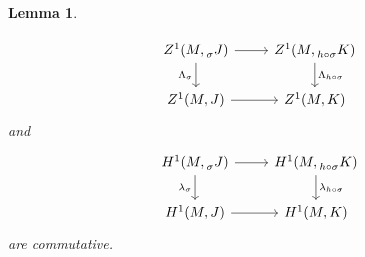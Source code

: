 \documentclass[a4paper,english,12pt]{amsart}
\newcommand{\sJ}{\prescript{}{\sigma}J}
\newtheorem{lem}[equation]{Lemma}
\numberwithin{equation}{subsection}
\begin{document}
\begin{lem}
\begin{enumerate}
\[\begin{tikzcd}
	{Z^1(M, \sJ)} & {Z^1(M,\prescript{}{h\circ\sigma}K)} \\
	{Z^1(M,J)} & {Z^1(M,K)}
	\arrow[from=1-1, to=1-2]
	\arrow["{\Lambda_{\sigma}}"', from=1-1, to=2-1]
	\arrow[from=2-1, to=2-2]
	\arrow["{\Lambda_{h\circ\sigma}}", from=1-2, to=2-2]
\end{tikzcd}\]
and
\[\begin{tikzcd}
	{H^1(M, \sJ)} & {H^1(M,\prescript{}{h\circ\sigma}K)} \\
	{H^1(M,J)} & {H^1(M,K)}
	\arrow[from=1-1, to=1-2]
	\arrow["{\lambda_{\sigma}}"', from=1-1, to=2-1]
	\arrow[from=2-1, to=2-2]
	\arrow["{\lambda_{h\circ\sigma}}", from=1-2, to=2-2]
\end{tikzcd}\]
are commutative.
\end{enumerate}
\end{lem}
\end{document}
